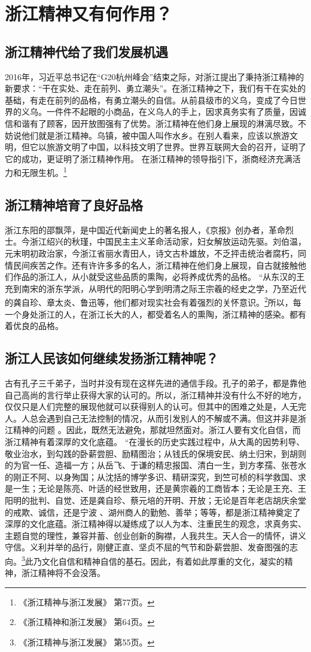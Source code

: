 \documentclass{article}
\begin{document}
  \section{浙江精神又有何作用？}
  \subsection{浙江精神代给了我们发展机遇}
  2016年，习近平总书记在“G20杭州峰会”结束之际，对浙江提出了秉持浙江精神的新要求：“干在实处、走在前列、勇立潮头”。在浙江精神之下，我们有干在实处的基础，有走在前列的品格，有勇立潮头的自信。从前县级市的义乌，变成了今日世界的义乌。一件件不起眼的小商品，在义乌人的手上，因求真务实有了质量，因诚信和谐有了顾客，因开放图强有了优势。浙江精神在他们身上展现的淋漓尽致。不妨说他们就是浙江精神。乌镇，被中国人叫作水乡。在别人看来，应该以旅游文明，但它以旅游文明了中国，以科技文明了世界。世界互联网大会的召开，证明了它的成功，更证明了浙江精神作用。  在浙江精神的领导指引下，浙商经济充满活力和无限生机。\footnote{《浙江精神与浙江发展》 第77页。}

  \subsection{浙江精神培育了良好品格}
  浙江东阳的邵飘萍，是中国近代新闻史上的著名报人，《京报》创办者，革命烈士。今浙江绍兴的秋瑾，中国民主主义革命活动家，妇女解放运动先驱。刘伯温，元末明初政治家，今浙江省丽水青田人，诗文古朴雄放，不乏抨击统治者腐朽，同 情民间疾苦之作。还有许许多多的名人，浙江精神在他们身上展现，自古就接触他们作品的浙江人，从小就受这些品质的熏陶，必将养成优秀的品格。  “从东汉的王充到南宋的浙东学派，从明代的阳明心学到明清之际王宗羲的经史之学，乃至近代的龚自珍、章太炎、鲁迅等，他们都对现实社会有着强烈的关怀意识。\footnote{《浙江精神和浙江发展》 第64页。}所以，每一个身处浙江的人，在浙江长大的人，都受着名人的熏陶，浙江精神的感染。都有着优良的品格。

  \subsection{浙江人民该如何继续发扬浙江精神呢？}
  古有孔子三千弟子，当时并没有现在这样先进的通信手段。孔子的弟子，都是靠他自己高尚的言行举止获得大家的认可的。所以，浙江精神并没有什么不好的地方，仅仅只是人们完整的展现他就可以获得别人的认可。但其中的困难之处是，人无完人。人总会遇到自己无法控制的情况，从而引发别人的不解或不满。但这并非是浙江精神的问题 。因此，既然无法避免，那就坦然面对。浙江人要有文化自信，而浙江精神有着深厚的文化底蕴。  “在漫长的历史实践过程中，从大禹的因势利导、敬业治水，到勾践的卧薪尝胆、励精图治；从钱氏的保境安民、纳土归宋，到胡则的为官一任、造福一方；从岳飞、于谦的精忠报国、清白一生，到方孝孺、张苍水的刚正不阿、以身殉国；从沈括的博学多识、精研深究，到竺可桢的科学救国、求是一生；无论是陈亮、叶适的经世致用，还是黄宗羲的工商皆本；无论是王充、王阳明的批判、自觉、还是龚自珍、蔡元培的开明、开放；无论是百年老店胡庆余堂的戒欺、诚信，还是宁波 、湖州商人的勤勉、善举；等等，都是浙江精神奠定了深厚的文化底蕴。浙江精神得以凝练成了以人为本、注重民生的观念，求真务实、主题自觉的理性，兼容并蓄、创业创新的胸襟，人我共生。天人合一的情怀，讲义守信。义利并举的品行，刚健正直、坚贞不屈的气节和卧薪尝胆、发奋图强的志向。\footnote{《浙江精神与浙江发展》 第55页。}此乃文化自信和精神自信的基石。因此，有着如此厚重的文化，凝实的精神，浙江精神将不会没落。
\end{document}
